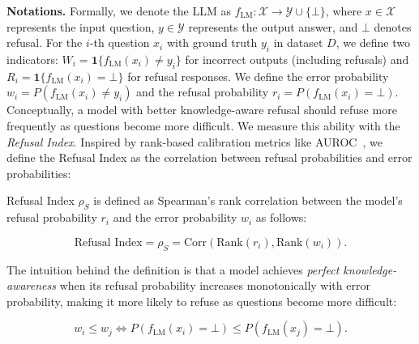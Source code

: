 \noindent\textbf{Notations.}
Formally, we denote the LLM as $f_{\text{LM}}: \mathcal{X} \rightarrow \mathcal{Y} \cup \{\bot\}$, where $x \in \mathcal{X}$ represents the input question, $y \in \mathcal{Y}$ represents the output answer, and $\bot$ denotes refusal. 
For the $i$-th question $x_i$ with ground truth $y_i$ in dataset $D$, we define two indicators: $W_i = \mathbf{1}\{f_{\text{LM}}(x_i) \neq y_i\}$ for incorrect outputs (including refusals) and $R_i = \mathbf{1}\{f_{\text{LM}}(x_i) = \bot\}$ for refusal responses. 
We define the error probability $w_i = P(f_{\text{LM}}(x_i) \neq y_i)$ and the refusal probability $r_i = P(f_{\text{LM}}(x_i) = \bot)$. 
Conceptually, a model with better knowledge-aware refusal should refuse more frequently as questions become more difficult. 
We measure this ability with the \emph{Refusal Index}. 
Inspired by rank-based calibration metrics like AUROC~\citep{NiculescuMizil2005PredictingGP}, we define the Refusal Index as the correlation between refusal probabilities and error probabilities:

\begin{definition}
Refusal Index $\rho_S$ is defined as Spearman's rank correlation between the model's refusal probability $r_i$ and the error probability $w_i$ as follows:

\vspace{-1em}
\begin{equation}
   \text{Refusal Index} = \rho_S  = \text{Corr}(\text{Rank}(r_i), \text{Rank}(w_i)).
\end{equation}
\vspace{-1.5em}

\end{definition}

The intuition behind the definition is that a model achieves \emph{perfect knowledge-awareness} when its refusal probability increases monotonically with error probability, making it more likely to refuse as questions become more difficult:

\vspace{-1em}
\begin{equation}
w_i \leq w_j \iff P(f_{\text{LM}}(x_i) = \bot) \leq P(f_{\text{LM}}(x_j) = \bot).
\label{eq:refusal_perfect_calibrated}
\end{equation}
\vspace{-1.5em}

